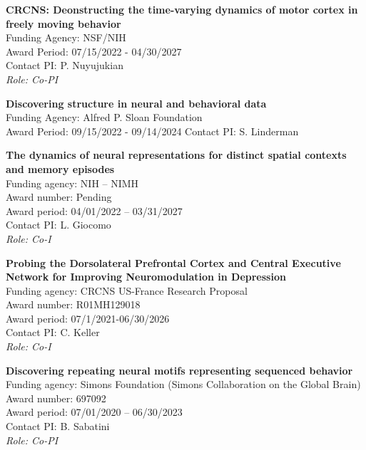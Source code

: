 \documentclass[10pt]{article}
\begin{document}
\begin{outerlist}
\item \textbf{CRCNS: Deonstructing the time-varying dynamics of motor cortex in freely moving behavior} \\
  Funding Agency: NSF/NIH \\
  Award Period: 07/15/2022 - 04/30/2027 \\
  Contact  PI: P. Nuyujukian \\
  \textit{Role: Co-PI}
  
\item \textbf{Discovering structure in neural and behavioral data} \\
  Funding Agency: Alfred P. Sloan Foundation \\
  Award Period: 09/15/2022 - 09/14/2024
  Contact PI: S. Linderman
  
  
\item \textbf{The dynamics of neural representations for distinct spatial contexts and memory episodes} \\
  Funding agency: NIH – NIMH \\
  Award number: Pending \\
  Award period: 04/01/2022 – 03/31/2027 \\
  Contact PI: L. Giocomo  \\
  \textit{Role: Co-I}

\item \textbf{Probing the Dorsolateral Prefrontal Cortex and Central Executive Network for Improving Neuromodulation in Depression} \\
  Funding agency: CRCNS US-France Research Proposal \\
  Award number: R01MH129018 \\
  Award period: 07/1/2021-06/30/2026 \\
  Contact PI: C. Keller  \\
  \textit{Role: Co-I}

\item \textbf{Discovering repeating neural motifs representing sequenced behavior} \\
  Funding agency: Simons Foundation (Simons Collaboration on the Global Brain) \\
  Award number: 697092 \\
  Award period: 07/01/2020 -- 06/30/2023 \\
  Contact PI: B. Sabatini \\
  \textit{Role: Co-PI}



\end{outerlist}
\end{document}
